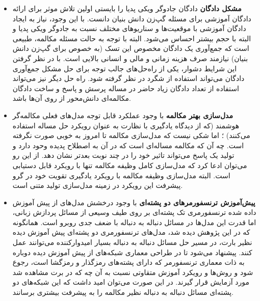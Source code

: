 \begin{itemize}
	\item 
	\textbf{مشکل دادگان}
	دادگان جادوگر ویکی پدیا را بایستی اولین تلاش موثر برای ارائه دادگان آموزشی برای مسئله گپ‌زن دانش بنیان دانست. با این وجود،‌ نیاز به ایجاد دادگان آموزشی با موقعیت‌ها و سناریو‌های مختلف نسبت به جادوگر ویکی پدیا و البته با حجم بیشتر احساس می‌شود. البته با توجه به حالت مسئله مکالمه،
	 طبیعی است که جمع‌آوری یک دادگان مخصوص این تسک (به خصوص برای گپ‌زن دانش بنیان) نیازمند صرف هزینه زمانی و مالی و انسانی بالایی است. با در نظر گرفتن این شرایط دشوار،
	 یکی از راه‌حل‌های جالب توجه برای حل مشکل جمع‌آوری دادگان می‌تواند استفاده از شگرد 
	 در نظر گرفته شود. راه حل دیگر نیز می‌تواند استفاده از تعداد دادگان زیاد حاضر در مساله پرسش و پاسخ و ساخت دادگان مکالمه‌ای دانش‌محور از روی آن‌ها باشد.
	\item
	\textbf{مدل‌سازی بهتر مکالمه}
	با وجود عملکرد قابل توجه مدل‌های فعلی مکالمه‌گر هوشمند (که از دیدگاه یادگیری با نظارت به عنوان رویکرد حل مساله استفاده می‌کنند) ؛ اما شکی نیست که مدل‌سازی مکالمه تا امروز به خوبی صورت نگرفته است. چه ‌آن که مکالمه مساله‌ای است که در آن به اصطلاح پدیده 
	وحود دارد و تولید یک پاسخ می‌تواند تاثیر خود را در چند نوبت بعدتر نشان دهد. 
	از این رو می‌توان ادعا کرد که مدل‌سازی کامل وظیفه مکالمه تنها با رویکرد 
	قابل دستیابی است. البته مدل‌سازی وظیفه مکالمه با رویکرد یادگیری تقویت خود در گرو پیشرفت این رویکرد در زمینه مدل‌سازی تولید متنی است.
	\item
	\textbf{پیش‌آموزش ترنسفورمر‌های دو پشته‌ای}
	با وجود درخشش مدل‌های از پیش آموزش داده شده ترنسفورمری تک پشته‌ای بر روی طیف وسیعی از مسائل پردازش زبانی، اما قدرت این مدل‌ها در مسائل دنباله به دنباله با ضعف جدی روبرو است. همانگونه که در این پژوهش دیده شد،‌ مدل‌های ترنسفورمری دو پشته‌ای پیش آموزش دیده نظیر بارت، در مسیر حل مسائل دنباله به دنباله بسیار امیدوارکننده می‌توانند عمل کنند. پیشنهاد می‌شود تا در طراحی معماری شبکه‌های از پیش آموزش دیده دوباره به ذات معماری ترنسفورمر که دارای پشته‌های رمزگذار و رمزگشا است، رجوع شود و روش‌ها و رویکرد آموزش متقاوتی نسبت به آن چه که در برت مشاهده شد مورد آزمایش قرار گیرند. در این صورت می‌توان امید داشت که این شبکه‌های دو پشته‌ای مسائل دنباله به دنباله نظیر مکالمه را به پیشرفت بیشتری برسانند.
\end{itemize}


